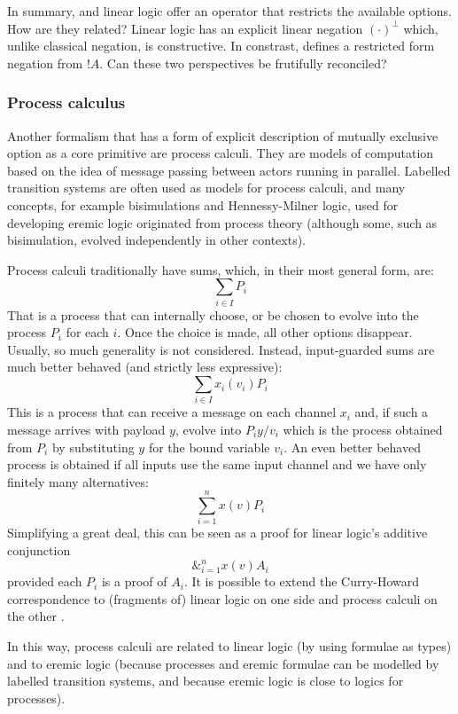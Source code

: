 In summary, \ELABR{} and linear logic offer an operator that restricts
the available options. How are they related? Linear logic has an
explicit linear negation $(\cdot)^{\bot}$ which, unlike classical
negation, is constructive. In constrast, \ELABR{} defines a restricted
form negation from $!A$. Can these two perspectives be frutifully
reconciled?

\subsubsection{Process calculus}

Another formalism that has a form of explicit description of mutually
exclusive option as a core primitive are process calculi. They are
models of computation based on the idea of message passing between
actors running in parallel. Labelled transition systems are often used
as models for process calculi, and many concepts, for example
bisimulations and Hennessy-Milner logic, used for developing eremic
logic originated from process theory (although some, such as
bisimulation, evolved independently in other contexts).

Process calculi traditionally have sums, which, in their most general
form, are:
\[
     \sum_{i \in I} P_i
\]
That is a process that can internally choose, or be chosen to evolve
into the process $P_i$ for each $i$. Once the choice is made, all
other options disappear.  Usually, so much generality is not
considered. Instead, input-guarded sums are much better behaved (and
strictly less expressive):
  \[
     \sum_{i \in I} x_{i}(v_i)P_i
  \]
This is a process that can receive a message on each channel $x_i$
and, if such a message arrives with payload $y$, evolve into
$P_i{y/v_i}$ which is the process obtained from $P_i$ by substituting
$y$ for the bound variable $v_i$.  An even better behaved process is
obtained if all inputs use the same input channel and we have only
finitely many alternatives:
  \[
     \sum_{i = 1}^n x(v)P_i
  \]
  Simplifying a great deal, this can be seen as a proof for linear
  logic's additive conjunction
  \[
     \&_{i = 1}^n x(v)A_i
  \]
  provided each $P_i$ is a proof of $A_i$.  It is possible to extend
  the Curry-Howard correspondence to (fragments of) linear logic on
  one side and process calculi on the other \cite{GaySJ:typcalosp}.

In this way, process calculi are related to linear logic (by using
formulae as types) and to eremic logic (because processes and eremic
formulae can be modelled by labelled transition systems, and because
eremic logic is close to logics for processes).

